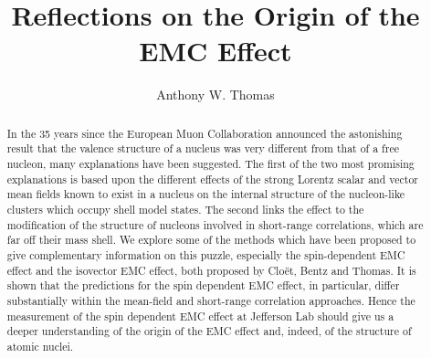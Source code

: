 \documentclass{ws-ijmpe}
\begin{document}

\catchline{}{}{}{}{}

\title{Reflections on the Origin of the EMC Effect}%

\author{Anthony W. Thomas}%

\address{CSSM and CoEPP, Department of Physics, The University of Adelaide\\
Adelaide, SA 5005,
Australia}%



\maketitle


\begin{abstract}
In the 35 years since the European Muon Collaboration announced the astonishing result that the valence 
structure of a nucleus was very different from that of a free nucleon, many explanations have been 
suggested. The first of the two most promising explanations is based upon the different effects of the strong 
Lorentz scalar and vector mean fields known to exist in a nucleus on the internal structure of the nucleon-like clusters which occupy shell model states. The second links the effect to the modification of the structure of nucleons involved 
in short-range correlations, which are far off their mass shell. We explore some of the methods which 
have been proposed to give complementary information on this puzzle, especially the spin-dependent 
EMC effect  and the isovector EMC effect, both proposed by Clo\"et, Bentz and Thomas. It is shown that 
the predictions for the spin dependent EMC effect, in particular, differ substantially within the mean-field 
and short-range correlation approaches. Hence the measurement of the spin dependent EMC effect 
at Jefferson Lab should give us a deeper understanding of the origin of the EMC effect and, indeed, 
of the structure of atomic nuclei.
\end{abstract}
\end{document}
